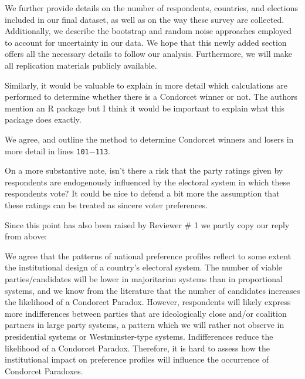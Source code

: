 \documentclass[a4paper, 12pt]{scrartcl}
\theoremstyle{break}
\newenvironment{changes}{\par\color{violet}\par\addvspace{\baselineskip}}{\par\addvspace{\baselineskip}}
\begin{document}
We further provide details on the number of respondents, countries, and elections included in our final dataset, as well as on the way these survey are collected. Additionally, we describe the bootstrap and random noise approaches employed to account for uncertainty in our data. We hope that this newly added section offers all the necessary details to follow our analysis. Furthermore, we will make all replication materials publicly available.

\begin{changes}
Similarly, it would be valuable to explain in more detail which calculations are performed to determine whether there is a Condorcet winner or not. The authors mention an R package but I think it would be important to explain what this package does exactly.
\end{changes}
We agree, and outline the method to determine Condorcet winners and losers in more detail in lines \texttt{101$-$113}.

\begin{changes}
On a more substantive note, isn’t there a risk that the party ratings given by respondents are endogenously influenced by the electoral system in which these respondents vote? It could be nice to defend a bit more the assumption that these ratings can be treated as sincere voter preferences.
\end{changes}
Since this point has also been raised by Reviewer \# 1 we partly copy our reply from above: 

We agree that the patterns of national preference profiles reflect to some extent the institutional design of a country's electoral system. The number of viable parties/candidates will be lower in majoritarian systems than in proportional systems, and we know from the literature that the number of candidates increases the likelihood of a Condorcet Paradox. However, respondents will likely express more indifferences between parties that are ideologically close and/or coalition partners in large party systems, a pattern which we will rather not observe in presidential systems or Westminster-type systems. Indifferences reduce the likelihood of a Condorcet Paradox. Therefore, it is hard to assess how the institutional impact on preference profiles will influence the occurrence of Condorcet Paradoxes. 
\end{document}
